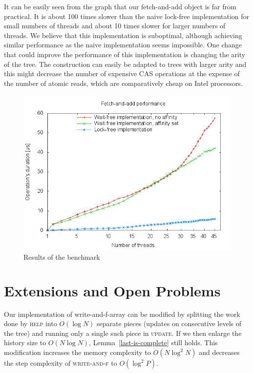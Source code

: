 \documentclass{thesis}
\newcommand{\fn}[1]{\textsc{#1}}
\begin{document}
It can be easily seen from the graph that our fetch-and-add object is far from practical. It is about 100 times slower than the naive lock-free implementation for small numbers of threads and about 10 times slower
for larger numbers of threads. We believe that this implementation is suboptimal, although achieving similar performance as the naive implementation seems impossible. One change that could improve the performance
of this implementation is changing the arity of the tree. The construction can easily be adapted to trees with larger arity and this might decrease the number of expensive CAS operations at the expense of the number
of atomic reads, which are comparatively cheap on Intel processors.

\begin{figure}
\includegraphics{meas.png}
\caption{Results of the benchmark}
\label{fig-meas}
\end{figure}

\chapter{Extensions and Open Problems}

Our implementation of write-and-f-array can be modified by splitting the work done by \fn{help} into $O(\log N)$ separate pieces (updates on consecutive levels of the tree) and running only a single such piece in \fn{update}.
If we then enlarge the history size to $O(N\log N)$, Lemma~\ref{last-is-complete} still holds. This modification increases the memory complexity to $O(N\log^2N)$ and decreases the step complexity of
\fn{write-and-f} to $O(\log^2P)$.
\end{document}
